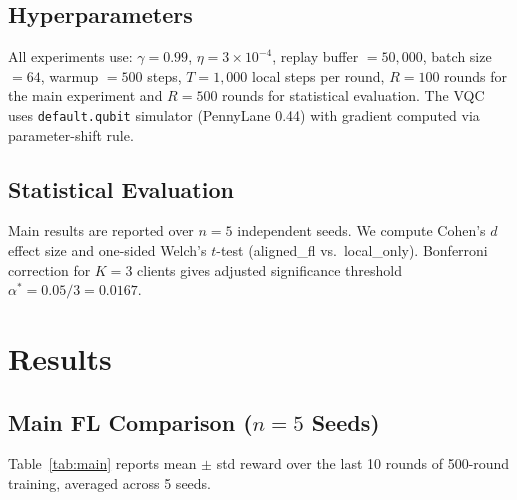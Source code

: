 \documentclass[journal]{IEEEtran}
\begin{document}
\subsection{Hyperparameters}

All experiments use: $\gamma=0.99$, $\eta=3\times10^{-4}$,
replay buffer $= 50{,}000$, batch size $= 64$, warmup $= 500$ steps,
$T = 1{,}000$ local steps per round, $R = 100$ rounds for the main
experiment and $R = 500$ rounds for statistical evaluation.
The VQC uses \texttt{default.qubit} simulator (PennyLane 0.44)
with gradient computed via parameter-shift rule.

\subsection{Statistical Evaluation}

Main results are reported over $n=5$ independent seeds.
We compute Cohen's $d$ effect size and one-sided Welch's $t$-test
(aligned\_fl vs.\ local\_only). Bonferroni correction for $K=3$ clients
gives adjusted significance threshold $\alpha^* = 0.05/3 = 0.0167$.

\section{Results}
\label{sec:results}

\subsection{Main FL Comparison ($n=5$ Seeds)}

Table~\ref{tab:main} reports mean $\pm$ std reward over the last 10 rounds
of 500-round training, averaged across 5 seeds.
\end{document}
